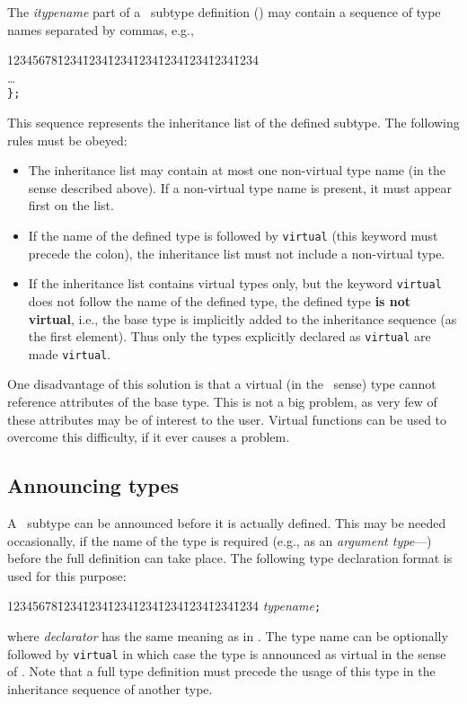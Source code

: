 The {\em itypename\/} part of a \smurph\ subtype definition
() may contain a sequence of type names separated by commas,
e.g.,
{\tt\begin{tabbing}
12345678\=1234\=1234\=1234\=1234\=1234\=1234\=1234\=1234\kill
{}\\
\> \>\ldots \\
\> {\tt \};}
\end{tabbing}}
This sequence represents the inheritance list of the defined subtype.
The following rules must be obeyed:
\begin{itemize}
\item
The inheritance list may contain at most one non-virtual type name (in the
sense described above).
If a non-virtual type name is present, it must appear first on the list.
\item
If the name of the defined type is followed by {\tt virtual} (this keyword
must precede the colon), the inheritance list must not include a
non-virtual type.
\item
If the inheritance list contains virtual types only, but the keyword
{\tt virtual} does not follow the name of the defined type, the defined
type {\bf is not virtual}, i.e., the base type is implicitly added to
the inheritance sequence (as the first element).
Thus only the types explicitly declared as {\tt virtual} are made {\tt virtual}.
\end{itemize}

One disadvantage of this solution is that a virtual (in the \smurph\ sense)
type cannot reference attributes of the base type.
This is not a big problem, as very few of these attributes may be of
interest to the user.
Virtual functions can be used to overcome this difficulty, if it ever
causes a problem.

\subsection {Announcing types}
\label{rm_st_an}

A \smurph\ subtype can be announced before it is actually defined.
This may be needed occasionally, if the name of the type is required
(e.g.,
as an {\em argument type\/}---) before the full definition
can take place.
The following type declaration format is used for this purpose:
{\tt\begin{tabbing}
12345678\=1234\=1234\=1234\=1234\=1234\=1234\=1234\=1234\kill
{} {\em typename\/}{\tt ;}
\end{tabbing}}
\noindent
where {\em declarator\/} has the same meaning as in .
The type name can be optionally followed by {\tt virtual} in which case
the type is announced as virtual in the sense of .
Note that a full type definition must precede the usage of this type in the
inheritance sequence of another type.

